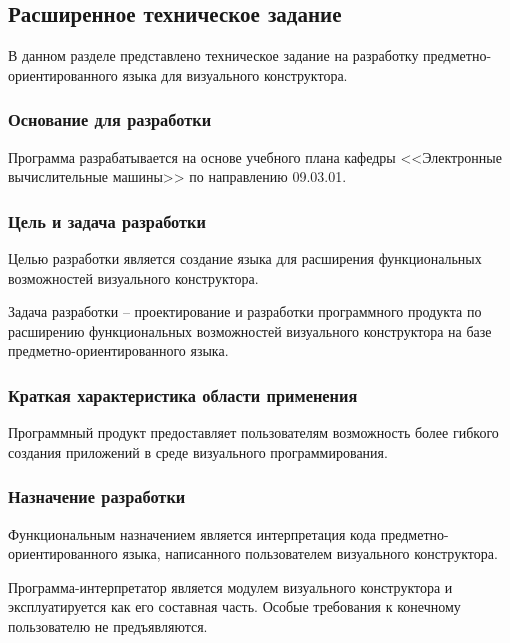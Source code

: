 \subsection{Расширенное техническое задание}

В данном разделе представлено техническое задание на разработку предметно-ориентированного языка для визуального конструктора.

\subsubsection{Основание для разработки}

Программа разрабатывается на основе учебного плана кафедры
<<Электронные вычислительные машины>> по направлению 09.03.01.



\subsubsection{Цель и задача разработки}

Целью разработки является создание языка для расширения
функциональных возможностей визуального конструктора.

Задача разработки -- проектирование и разработки программного продукта по расширению функциональных возможностей визуального конструктора
на базе предметно-ориентированного языка. 



\subsubsection{Краткая характеристика области применения}

Программный продукт предоставляет пользователям возможность более гибкого создания приложений в среде визуального программирования.



\subsubsection{Назначение разработки}

Функциональным назначением является интерпретация кода предметно-ориентированного языка, написанного пользователем визуального конструктора.

Программа-интерпретатор является модулем визуального конструктора и эксплуатируется как его составная часть.
Особые требования к конечному пользователю не предъявляются.



